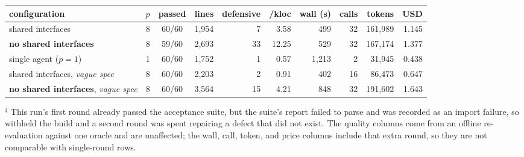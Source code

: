 \begin{tabular}{lrcrrrrrrr}
\toprule
configuration & $p$ & passed & lines & defensive & /kloc & wall (s) & calls & tokens & USD \\
\midrule
shared interfaces & 8 & 60/60 & 1,954 & 7 & 3.58 & 499 & 32\rlap{$^\ddagger$} & 161,989 & 1.145 \\
\textbf{no shared interfaces} & 8 & 59/60 & 2,693 & 33 & 12.25 & 529 & 32\rlap{$^\ddagger$} & 167,174 & 1.377 \\
single agent ($p{=}1$) & 1 & 60/60 & 1,752 & 1 & 0.57 & 1,213 & 2 & 31,945 & 0.438 \\
\midrule
shared interfaces, \emph{vague spec} & 8 & 60/60 & 2,203 & 2 & 0.91 & 402 & 16 & 86,473 & 0.647 \\
\textbf{no shared interfaces}, \emph{vague spec} & 8 & 60/60 & 3,564 & 15 & 4.21 & 848 & 32 & 191,602 & 1.643 \\
\bottomrule
\end{tabular}

{\footnotesize $^\ddagger$ This run's first round already passed the acceptance suite, but the suite's report failed to parse and was recorded as an import failure, so  withheld the build and a second round was spent repairing a defect that did not exist. The quality columns come from an offline re-evaluation against one oracle and are unaffected; the wall, call, token, and price columns include that extra round, so they are not comparable with single-round rows.}
